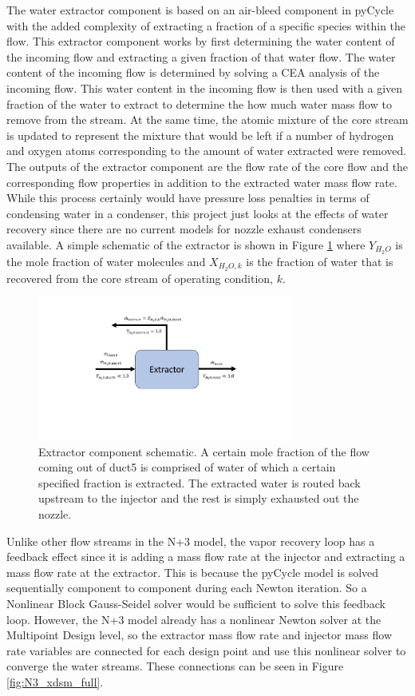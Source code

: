 \documentclass[conf]{new-aiaa}
\begin{document}
The water extractor component is based on an air-bleed component in pyCycle with the added complexity of extracting a fraction of a specific species within the flow.
This extractor component works by first determining the water content of the incoming flow and extracting a given fraction of that water flow.
The water content of the incoming flow is determined by solving a CEA analysis of the incoming flow.
This water content in the incoming flow is then used with a given fraction of the water to extract to determine the how much water mass flow to remove from the stream.
At the same time, the atomic mixture of the core stream is updated to represent the mixture that would be left if a number of hydrogen and oxygen atoms corresponding to the amount of water extracted were removed.
The outputs of the extractor component are the flow rate of the core flow and the corresponding flow properties in addition to the extracted water mass flow rate.
While this process certainly would have pressure loss penalties in terms of condensing water in a condenser, this project just looks at the effects of water recovery since there are no current models for nozzle exhaust condensers available.
A simple schematic of the extractor is shown in Figure \ref{fig:extractor} where $Y_{H_2O}$ is the mole fraction of water molecules and $X_{H_2O,k}$ is the fraction of water that is recovered from the core stream of operating condition, $k$.

\begin{figure}[hbt!]
  \centering
  \includegraphics[width=0.75\textwidth]{extractor.pdf}
  \caption{
    Extractor component schematic.
    A certain mole fraction of the flow coming out of duct5 is comprised of water of which a certain specified fraction is extracted.
    The extracted water is routed back upstream to the injector and the rest is simply exhausted out the nozzle.
  }
  \label{fig:extractor}
\end{figure}

Unlike other flow streams in the N+3 model, the vapor recovery loop has a feedback effect since it is adding a mass flow rate at the injector and extracting a mass flow rate at the extractor.
This is because the pyCycle model is solved sequentially component to component during each Newton iteration.
So a Nonlinear Block Gauss-Seidel solver would be sufficient to solve this feedback loop.
However, the N+3 model already has a nonlinear Newton solver at the Multipoint Design level, so the extractor mass flow rate and injector mass flow rate variables are connected for each design point and use this nonlinear solver to converge the water streams.
These connections can be seen in Figure \ref{fig:N3_xdsm_full}.
\end{document}
